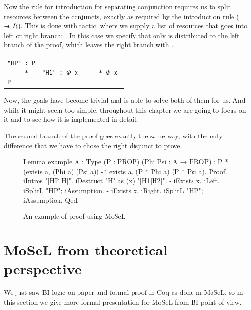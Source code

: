 Now the rule for introduction for separating conjunction requires us to split resources between the conjuncts, exactly as required by the introduction rule (\(\mathrel{-\mkern-6mu*} R\)).
This is done with  tactic, where we supply a list of resources that goes into left or right branch: .
In this case we specify that only  is distributed to the left branch of the proof, which leaves the right branch with .

\begin{minipage}[t]{\linewidth}
\begin{tabular}{l l}
  \parbox[t]{0.5\textwidth}{\texttt{"HP" : P\\
  ---------------*\\
  P}} &
  \parbox[t]{0.5\textwidth}{\texttt{"H1" : $\Phi$ x\\
  ---------------*\\
  $\Phi$ x }}
\end{tabular}
\end{minipage}


Now, the goals have become trivial and  is able to solve both of them for us.
And while it might seem too simple, throughout this chapter we are going to focus on it and to see how it is implemented in detail.

The second branch of the proof goes exactly the same way, with the only difference that we have to chose the right disjunct to prove.

\begin{figure}
\begin{coq}
Lemma example {A : Type} (P : PROP) (Phi Psi : A → PROP) :
  P * (exists a, (Phi a) \/ (Psi a)) -* exists a, (P * Phi a) \/ (P * Psi a).
Proof.
  iIntros "[HP H]".
  iDestruct "H" as (x) "[H1|H2]".
  - iExists x. iLeft. iSplitL "HP"; iAssumption.
  - iExists x. iRight. iSplitL "HP"; iAssumption.
Qed.
\end{coq}
  \caption{An example of proof using MoSeL}
  \label{fig:mosel-example-full}
\end{figure}

\section{MoSeL from theoretical perspective}
\label{sec:ipm_theory}

We just saw BI logic on paper and formal proof in Coq as done in MoSeL, so in this section we give more formal presentation for MoSeL from BI point of view.

